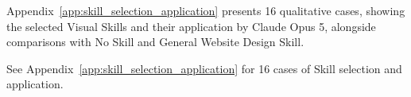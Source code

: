 Appendix~\ref{app:skill_selection_application} presents 16
qualitative cases, showing the selected Visual Skills and their
application by Claude Opus 5, alongside comparisons with
No Skill and General Website Design Skill.

See Appendix~\ref{app:skill_selection_application} for 16
cases of Skill selection and application.

